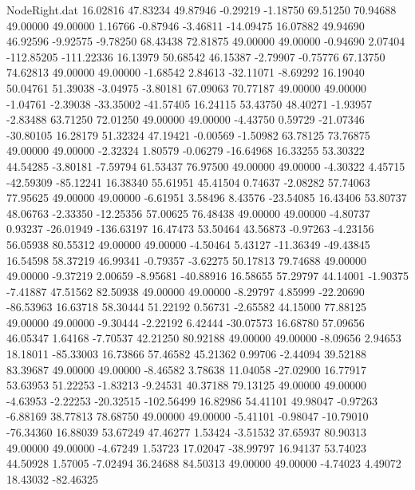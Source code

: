 \begin{filecontents}{NodeRight.dat}
  16.02816   47.83234   49.87946    -0.29219   -1.18750   69.51250   70.94688   49.00000   49.00000    1.16766   -0.87946   -3.46811  -14.09475
  16.07882   49.94690   46.92596    -9.92575   -9.78250   68.43438   72.81875   49.00000   49.00000   -0.94690    2.07404 -112.85205 -111.22336
  16.13979   50.68542   46.15387    -2.79907   -0.75776   67.13750   74.62813   49.00000   49.00000   -1.68542    2.84613  -32.11071   -8.69292
  16.19040   50.04761   51.39038    -3.04975   -3.80181   67.09063   70.77187   49.00000   49.00000   -1.04761   -2.39038  -33.35002  -41.57405
  16.24115   53.43750   48.40271    -1.93957   -2.83488   63.71250   72.01250   49.00000   49.00000   -4.43750    0.59729  -21.07346  -30.80105
  16.28179   51.32324   47.19421    -0.00569   -1.50982   63.78125   73.76875   49.00000   49.00000   -2.32324    1.80579   -0.06279  -16.64968
  16.33255   53.30322   44.54285    -3.80181   -7.59794   61.53437   76.97500   49.00000   49.00000   -4.30322    4.45715  -42.59309  -85.12241
  16.38340   55.61951   45.41504     0.74637   -2.08282   57.74063   77.95625   49.00000   49.00000   -6.61951    3.58496    8.43576  -23.54085
  16.43406   53.80737   48.06763    -2.33350  -12.25356   57.00625   76.48438   49.00000   49.00000   -4.80737    0.93237  -26.01949 -136.63197
  16.47473   53.50464   43.56873    -0.97263   -4.23156   56.05938   80.55312   49.00000   49.00000   -4.50464    5.43127  -11.36349  -49.43845
  16.54598   58.37219   46.99341    -0.79357   -3.62275   50.17813   79.74688   49.00000   49.00000   -9.37219    2.00659   -8.95681  -40.88916
  16.58655   57.29797   44.14001    -1.90375   -7.41887   47.51562   82.50938   49.00000   49.00000   -8.29797    4.85999  -22.20690  -86.53963
  16.63718   58.30444   51.22192     0.56731   -2.65582   44.15000   77.88125   49.00000   49.00000   -9.30444   -2.22192    6.42444  -30.07573
  16.68780   57.09656   46.05347     1.64168   -7.70537   42.21250   80.92188   49.00000   49.00000   -8.09656    2.94653   18.18011  -85.33003
  16.73866   57.46582   45.21362     0.99706   -2.44094   39.52188   83.39687   49.00000   49.00000   -8.46582    3.78638   11.04058  -27.02900
  16.77917   53.63953   51.22253    -1.83213   -9.24531   40.37188   79.13125   49.00000   49.00000   -4.63953   -2.22253  -20.32515 -102.56499
  16.82986   54.41101   49.98047    -0.97263   -6.88169   38.77813   78.68750   49.00000   49.00000   -5.41101   -0.98047  -10.79010  -76.34360
  16.88039   53.67249   47.46277     1.53424   -3.51532   37.65937   80.90313   49.00000   49.00000   -4.67249    1.53723   17.02047  -38.99797
  16.94137   53.74023   44.50928     1.57005   -7.02494   36.24688   84.50313   49.00000   49.00000   -4.74023    4.49072   18.43032  -82.46325

\end{filecontents}
